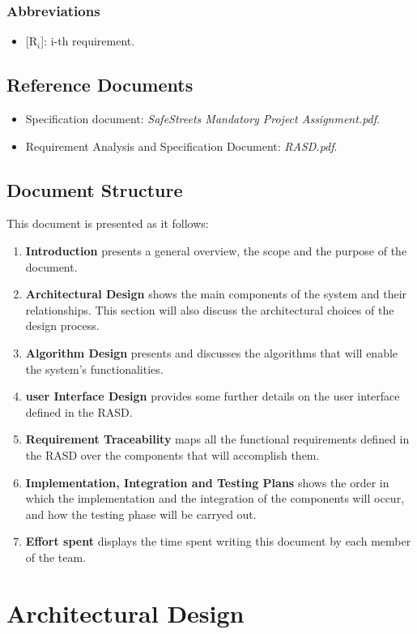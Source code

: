 \documentclass{report}
\begin{document}
\subsection{Abbreviations}
\begin{itemize}
    \item {[R$_{i}$]}: i-th requirement.
    \end{itemize}
\section{Reference Documents}
\begin{itemize}
    \item Specification document: \textit{SafeStreets Mandatory Project Assignment.pdf}.
    \item Requirement Analysis and Specification Document: \textit{RASD.pdf}.
\end{itemize}
\section{Document Structure}
This document is presented as it follows:
\begin{enumerate}
    \item \textbf{Introduction} presents a general overview, the scope and the purpose of the document.
    \item \textbf{Architectural Design} shows the main components of the system and their relationships. This section will also discuss the architectural choices of the design process.
    \item \textbf{Algorithm Design} presents and discusses the algorithms that will enable the system's functionalities.
    \item \textbf{user Interface Design} provides some further details on the user interface defined in the RASD.
    \item \textbf{Requirement Traceability} maps all the functional requirements defined in the RASD over the components that will accomplish them.
    \item \textbf{Implementation, Integration and Testing Plans} shows the order in which the implementation and the integration of the components will occur, and how the testing phase will be carryed out.
    \item {\textbf{Effort spent}} displays the time spent writing this document by each member of the team.
\end{enumerate}
\chapter{Architectural Design}
\end{document}
